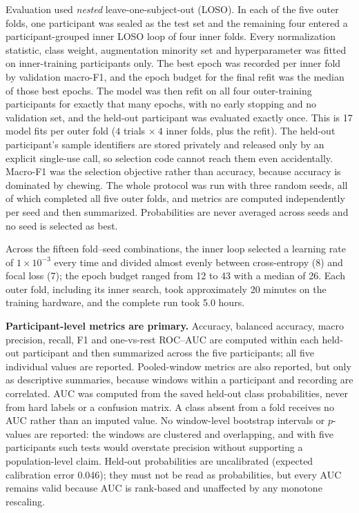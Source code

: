 \documentclass[pdflatex,sn-nature,iicol]{sn-jnl}
\begin{document}
Evaluation used \emph{nested} leave-one-subject-out (LOSO). In each of the five outer folds, one participant was sealed as the test set and the remaining four entered a participant-grouped inner LOSO loop of four inner folds. Every normalization statistic, class weight, augmentation minority set and hyperparameter was fitted on inner-training participants only. The best epoch was recorded per inner fold by validation macro-F1, and the epoch budget for the final refit was the median of those best epochs. The model was then refit on all four outer-training participants for exactly that many epochs, with no early stopping and no validation set, and the held-out participant was evaluated exactly once. This is 17 model fits per outer fold ($4$ trials $\times\ 4$ inner folds, plus the refit). The held-out participant's sample identifiers are stored privately and released only by an explicit single-use call, so selection code cannot reach them even accidentally. Macro-F1 was the selection objective rather than accuracy, because accuracy is dominated by chewing. The whole protocol was run with three random seeds, all of which completed all five outer folds, and metrics are computed independently per seed and then summarized. Probabilities are never averaged across seeds and no seed is selected as best.

Across the fifteen fold--seed combinations, the inner loop selected a learning rate of $1\times10^{-3}$ every time and divided almost evenly between cross-entropy (8) and focal loss (7); the epoch budget ranged from 12 to 43 with a median of 26. Each outer fold, including its inner search, took approximately 20 minutes on the training hardware, and the complete run took 5.0 hours.

\textbf{Participant-level metrics are primary.} Accuracy, balanced accuracy, macro precision, recall, F1 and one-vs-rest ROC--AUC are computed within each held-out participant and then summarized across the five participants; all five individual values are reported. Pooled-window metrics are also reported, but only as descriptive summaries, because windows within a participant and recording are correlated. AUC was computed from the saved held-out class probabilities, never from hard labels or a confusion matrix. A class absent from a fold receives no AUC rather than an imputed value. No window-level bootstrap intervals or $p$-values are reported: the windows are clustered and overlapping, and with five participants such tests would overstate precision without supporting a population-level claim. Held-out probabilities are uncalibrated (expected calibration error 0.046); they must not be read as probabilities, but every AUC remains valid because AUC is rank-based and unaffected by any monotone rescaling.
\end{document}
